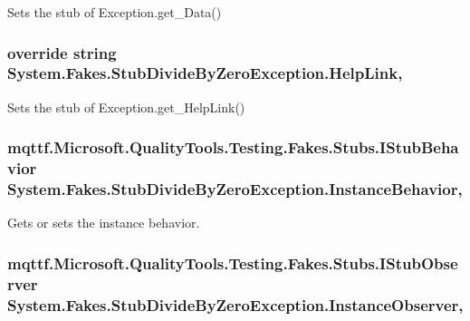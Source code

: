 Sets the stub of Exception.\-get\-\_\-\-Data()

\hypertarget{class_system_1_1_fakes_1_1_stub_divide_by_zero_exception_a8492480a2e447faf70f6635bf0b726dc}{
\subsubsection[{Help\-Link}]{\setlength{\rightskip}{0pt plus 5cm}override string System.\-Fakes.\-Stub\-Divide\-By\-Zero\-Exception.\-Help\-Link\hspace{0.3cm}{\ttfamily [get]}, {\ttfamily [set]}}}\label{class_system_1_1_fakes_1_1_stub_divide_by_zero_exception_a8492480a2e447faf70f6635bf0b726dc}


Sets the stub of Exception.\-get\-\_\-\-Help\-Link()

\hypertarget{class_system_1_1_fakes_1_1_stub_divide_by_zero_exception_a76b680b7eda7dece5877651e17744253}{
\subsubsection[{Instance\-Behavior}]{\setlength{\rightskip}{0pt plus 5cm}mqttf.\-Microsoft.\-Quality\-Tools.\-Testing.\-Fakes.\-Stubs.\-I\-Stub\-Behavior System.\-Fakes.\-Stub\-Divide\-By\-Zero\-Exception.\-Instance\-Behavior\hspace{0.3cm}{\ttfamily [get]}, {\ttfamily [set]}}}\label{class_system_1_1_fakes_1_1_stub_divide_by_zero_exception_a76b680b7eda7dece5877651e17744253}


Gets or sets the instance behavior.

\hypertarget{class_system_1_1_fakes_1_1_stub_divide_by_zero_exception_a1161d883fd863b8092c8c907e4a4e792}{
\subsubsection[{Instance\-Observer}]{\setlength{\rightskip}{0pt plus 5cm}mqttf.\-Microsoft.\-Quality\-Tools.\-Testing.\-Fakes.\-Stubs.\-I\-Stub\-Observer System.\-Fakes.\-Stub\-Divide\-By\-Zero\-Exception.\-Instance\-Observer\hspace{0.3cm}{\ttfamily [get]}, {\ttfamily [set]}}}\label{class_system_1_1_fakes_1_1_stub_divide_by_zero_exception_a1161d883fd863b8092c8c907e4a4e792}


